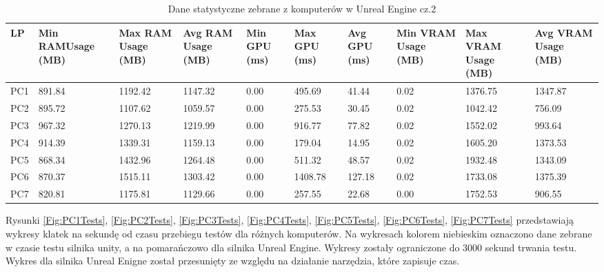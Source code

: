 \documentclass[12pt,twoside]{article}
\begin{document}
\begin{table}[ht]
    \caption{Dane statystyczne zebrane z komputerów w Unreal Engine cz.2}
    \centering		
        \begin{tabular}{|p{1cm}|p{}|p{}|p{}|p{1cm}|p{}|p{1cm}|p{1cm}|p{}|p{}|}	
            \hline
            LP & Min RAMUsage (MB) & Max RAM Usage (MB) & Avg RAM Usage (MB) & Min GPU (ms) & Max GPU (ms)  & Avg GPU (ms) & Min VRAM Usage (MB) & Max VRAM Usage (MB) & Avg VRAM Usage (MB) \\
            \hline
            PC1 & 891.84 & 1192.42 & 1147.32 & 0.00 & 495.69 & 41.44 & 0.02 & 1376.75 & 1347.87 \\
            \hline
            PC2 & 895.72 & 1107.62 & 1059.57 & 0.00 & 275.53 & 30.45 & 0.02 & 1042.42 & 756.09 \\
            \hline
            PC3 & 967.32 & 1270.13 & 1219.99 & 0.00 & 916.77 & 77.82 & 0.02 & 1552.02 & 993.64 \\
            \hline
            PC4 & 914.39 & 1339.31 & 1159.13 & 0.00 & 179.04 & 14.95 & 0.02 & 1605.20 & 1373.53 \\
            \hline
            PC5 & 868.34 & 1432.96 & 1264.48 & 0.00 & 511.32 & 48.57 & 0.02 & 1932.48 & 1343.09 \\
            \hline
            PC6 & 870.37 & 1515.11 & 1303.42 & 0.00 & 1408.78 & 127.18 & 0.02 & 1733.08 & 1375.39 \\
            \hline
            PC7 & 820.81 & 1175.81 & 1129.66 & 0.00 & 257.55 & 22.68 & 0.00 & 1752.53 & 906.55 \\
            \hline
            \hline

        \end{tabular}	
\label{Tabela:StatystykiUnreal2}
\end{table}	
\clearpage

Rysunki
\ref{Fig:PC1Tests}, \ref{Fig:PC2Tests}, \ref{Fig:PC3Tests}, \ref{Fig:PC4Tests}, \ref{Fig:PC5Tests}, \ref{Fig:PC6Tests}, \ref{Fig:PC7Tests}
przedstawiają wykresy klatek na sekundę od czasu przebiegu testów dla różnych
komputerów. Na wykresach kolorem niebieskim oznaczono dane zebrane w czasie
testu silnika unity, a na pomarańczowo dla silnika Unreal Engine. Wykresy
zostały ograniczone do 3000 sekund trwania testu. Wykres dla silnika Unreal
Enigne został przesunięty ze względu na działanie narzędzia, które zapisuje
czas. 
\end{document}
